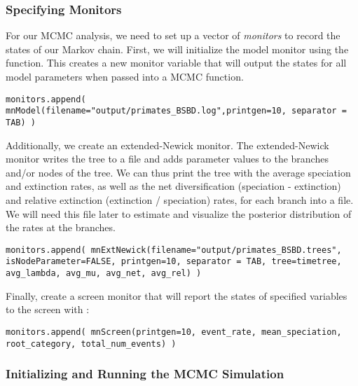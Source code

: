 \subsubsection{Specifying Monitors}

For our MCMC analysis, we need to set up a vector of \textit{monitors} to record the states of our Markov chain.
First, we will initialize the model monitor using the  function.
This creates a new monitor variable that will output the states for all model parameters when passed into a MCMC function.
{\tt \begin{snugshade*}
\begin{lstlisting}
monitors.append( mnModel(filename="output/primates_BSBD.log",printgen=10, separator = TAB) )
\end{lstlisting}
\end{snugshade*}}

Additionally, we create an extended-Newick monitor.
The extended-Newick monitor writes the tree to a file and adds parameter values to the branches and/or nodes of the tree.
We can thus print the tree with the average speciation and extinction rates, as well as the net diversification (speciation - extinction) and relative extinction (extinction / speciation) rates, for each branch into a file.
We will need this file later to estimate and visualize the posterior distribution of the rates at the branches.
{\tt \begin{snugshade*}
\begin{lstlisting}
monitors.append( mnExtNewick(filename="output/primates_BSBD.trees", isNodeParameter=FALSE, printgen=10, separator = TAB, tree=timetree, avg_lambda, avg_mu, avg_net, avg_rel) )
\end{lstlisting}
\end{snugshade*}}

Finally, create a screen monitor that will report the states of specified variables to the screen with :
{\tt \begin{snugshade*}
\begin{lstlisting}
monitors.append( mnScreen(printgen=10, event_rate, mean_speciation, root_category, total_num_events) )
\end{lstlisting}
\end{snugshade*}}

\subsubsection{Initializing and Running the MCMC Simulation}

